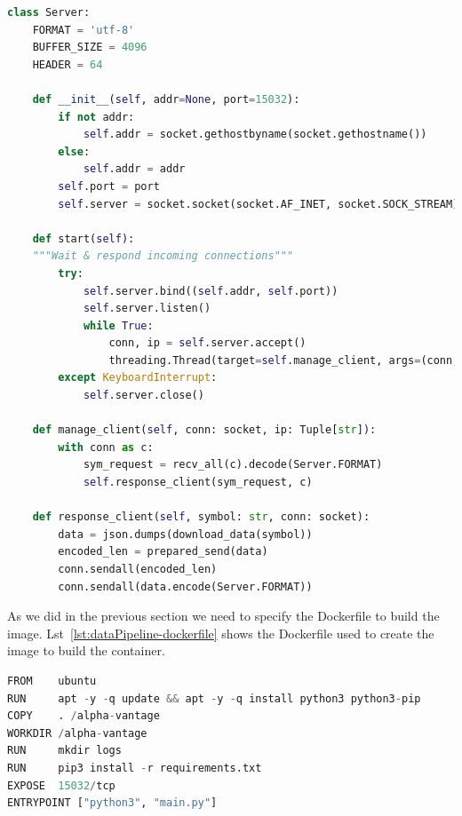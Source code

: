 \begin{lstlisting}[language=python,caption=server.py,label={lst:server.py}]
class Server:
    FORMAT = 'utf-8'
    BUFFER_SIZE = 4096
    HEADER = 64

    def __init__(self, addr=None, port=15032):
        if not addr:
            self.addr = socket.gethostbyname(socket.gethostname())
        else:
            self.addr = addr
        self.port = port
        self.server = socket.socket(socket.AF_INET, socket.SOCK_STREAM)

    def start(self):
    """Wait & respond incoming connections"""
        try:
            self.server.bind((self.addr, self.port))
            self.server.listen()
            while True:
                conn, ip = self.server.accept()
                threading.Thread(target=self.manage_client, args=(conn, ip)).start()
        except KeyboardInterrupt:
            self.server.close()

    def manage_client(self, conn: socket, ip: Tuple[str]):
        with conn as c:
            sym_request = recv_all(c).decode(Server.FORMAT)
            self.response_client(sym_request, c)

    def response_client(self, symbol: str, conn: socket):
        data = json.dumps(download_data(symbol))
        encoded_len = prepared_send(data)
        conn.sendall(encoded_len)
        conn.sendall(data.encode(Server.FORMAT))
\end{lstlisting}

As we did in the previous section we need to specify the Dockerfile to build the image. Lst~\ref{lst:dataPipeline-dockerfile} shows the Dockerfile used to create the image to build the container.

\begin{lstlisting}[language=python,caption=Data Pipeline Dockerfile,label={lst:dataPipeline-dockerfile}]
FROM    ubuntu
RUN     apt -y -q update && apt -y -q install python3 python3-pip
COPY    . /alpha-vantage
WORKDIR /alpha-vantage
RUN     mkdir logs
RUN     pip3 install -r requirements.txt
EXPOSE  15032/tcp
ENTRYPOINT ["python3", "main.py"]
\end{lstlisting}

    

